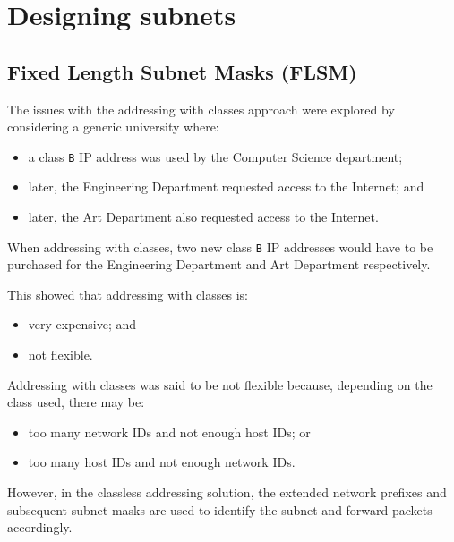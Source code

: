 \documentclass[a4paper]{systems-software}
\begin{document}
\section*{Designing subnets}

\subsection*{Fixed Length Subnet Masks (FLSM)}

The issues with the addressing with classes approach were explored by considering a generic university where:
\begin{itemize}
	\item a class \texttt{B} IP address was used by the Computer Science department;
	\item later, the Engineering Department requested access to the Internet; and
	\item later, the Art Department also requested access to the Internet.
\end{itemize}

When addressing with classes, two new class \texttt{B} IP addresses would have to be purchased for the Engineering Department and Art Department respectively.

This showed that addressing with classes is:
\begin{itemize}
	\item very expensive; and
	\item not flexible.
\end{itemize}

Addressing with classes was said to be not flexible because, depending on the class used, there may be:
\begin{itemize}
	\item too many network IDs and not enough host IDs; or
	\item too many host IDs and not enough network IDs. 
\end{itemize}

However, in the classless addressing solution, the extended network prefixes and subsequent subnet masks are used to identify the subnet and forward packets accordingly.
\end{document}
